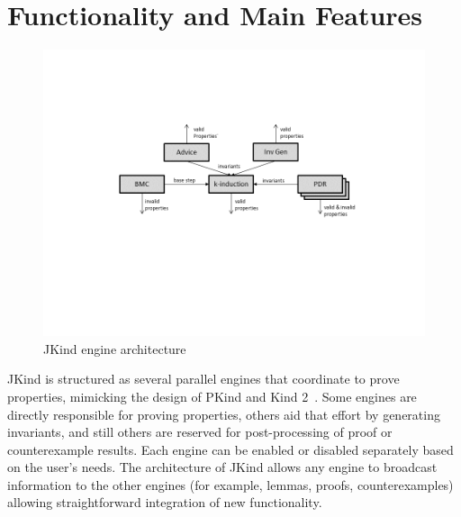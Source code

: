 \documentclass{llncs}
\newcommand{\jkind}{{\sc JKind}\xspace}
\newcommand{\kind}{{\sc Kind}\xspace}
\newcommand{\pkind}{{\sc PKind}\xspace}
\newcommand{\mike}[1]{\textcolor{red}{#1}}
\begin{document}
\section{Functionality and Main Features}

\begin{figure}
  \begin{center}
    \includegraphics[clip,trim=140 220 100 140,scale=0.6]{engines.png}
  \end{center}
  \vspace{-2em}
  \caption{\jkind engine architecture}
  \vspace{-1em}
  \label{fig:engines}
\end{figure}

\jkind is structured as several parallel engines that coordinate to
prove properties, mimicking the design of \pkind and \kind 2~\cite{champion2016cav, kahsai2011pdmc}.
Some engines are directly responsible for proving properties, others aid that effort by generating invariants, and still others are reserved for post-processing of proof or counterexample results. Each engine can be enabled or disabled separately based on the user's needs. The architecture of \jkind allows any engine to broadcast information to the other engines (for example, lemmas, proofs, counterexamples) allowing straightforward integration of new functionality.
\end{document}
